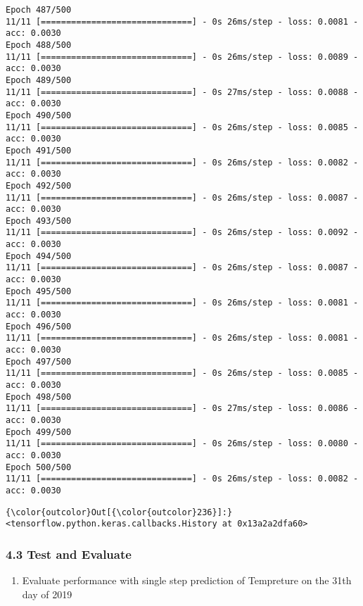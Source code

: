 \documentclass[11pt]{article}
\providecommand{\tightlist}{%
      \setlength{\itemsep}{0pt}\setlength{\parskip}{0pt}}
\begin{document}
\begin{Verbatim}[commandchars=\\\{\}]
Epoch 487/500
11/11 [==============================] - 0s 26ms/step - loss: 0.0081 - acc: 0.0030
Epoch 488/500
11/11 [==============================] - 0s 26ms/step - loss: 0.0089 - acc: 0.0030
Epoch 489/500
11/11 [==============================] - 0s 27ms/step - loss: 0.0088 - acc: 0.0030
Epoch 490/500
11/11 [==============================] - 0s 26ms/step - loss: 0.0085 - acc: 0.0030
Epoch 491/500
11/11 [==============================] - 0s 26ms/step - loss: 0.0082 - acc: 0.0030
Epoch 492/500
11/11 [==============================] - 0s 26ms/step - loss: 0.0087 - acc: 0.0030
Epoch 493/500
11/11 [==============================] - 0s 26ms/step - loss: 0.0092 - acc: 0.0030
Epoch 494/500
11/11 [==============================] - 0s 26ms/step - loss: 0.0087 - acc: 0.0030
Epoch 495/500
11/11 [==============================] - 0s 26ms/step - loss: 0.0081 - acc: 0.0030
Epoch 496/500
11/11 [==============================] - 0s 26ms/step - loss: 0.0081 - acc: 0.0030
Epoch 497/500
11/11 [==============================] - 0s 26ms/step - loss: 0.0085 - acc: 0.0030
Epoch 498/500
11/11 [==============================] - 0s 27ms/step - loss: 0.0086 - acc: 0.0030
Epoch 499/500
11/11 [==============================] - 0s 26ms/step - loss: 0.0080 - acc: 0.0030
Epoch 500/500
11/11 [==============================] - 0s 26ms/step - loss: 0.0082 - acc: 0.0030

    \end{Verbatim}

\begin{Verbatim}[commandchars=\\\{\}]
{\color{outcolor}Out[{\color{outcolor}236}]:} <tensorflow.python.keras.callbacks.History at 0x13a2a2dfa60>
\end{Verbatim}
            
    \subsubsection{4.3 Test and Evaluate}\label{test-and-evaluate}

    \begin{enumerate}
\def\labelenumi{\arabic{enumi})}
\tightlist
\item
  Evaluate performance with single step prediction of Tempreture on the
  31th day of 2019
\end{enumerate}
\end{document}
